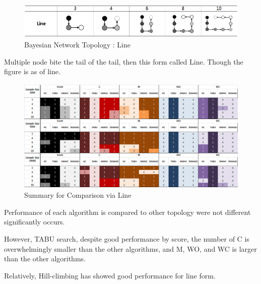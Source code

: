 	\begin{figure}[!bhp]
	\centering
		\includegraphics[height=50pt]{images/Topologies_Line}
		\caption{Bayesian Network Topology : Line}
	\end{figure}	

	Multiple node bite the tail of the tail, then this form called Line. Though the figure is as of line.

	\begin{figure}[!bhp]
	\centering
		\includegraphics[height=155pt]{images/Result_Line}
		\caption{Summary for Comparison via Line}
	\end{figure}	
	
Performance of each algorithm is compared to other topology were not different significantly occurs.

However, TABU search, despite good performance by score, the number of C is overwhelmingly smaller than the other algorithms, and M, WO, and WC is larger than the other algorithms.

Relatively, Hill-climbing has showed good performance for line form.

